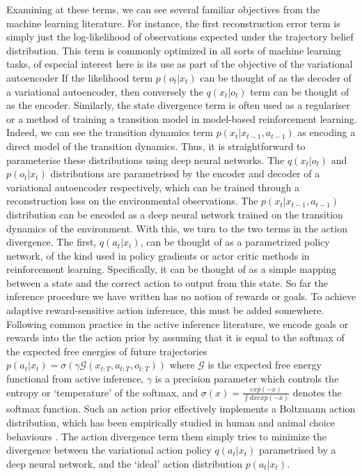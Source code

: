 Examining at these terms, we can see several familiar objectives from the machine learning literature. For instance, the first reconstruction error term is simply just the log-likelihood of observations expected under the trajectory belief distribution. This term is commonly optimized in all sorts of machine learning tasks, of especial interest here is its use as part of the objective of the variational autoencoder \citep{kingma_auto-encoding_2013} If the likelihood term $p(o_t | x_t)$ can be thought of as the decoder of a variational autoencoder, then conversely the $q(x_t | o_t)$ term can be thought of as the encoder. Similarly, the state divergence term is often used as a regulariser or a method of training a transition model in model-based reinforcement learning. Indeed, we can see the transition dynamics term $p(x_t | x_{t-1}, a_{t-1})$ as encoding a direct model of the transition dynamics. Thus, it is straightforward to parameterise these distributions using deep neural networks. The $q(x_t | o_t)$ and $p(o_t | x_t)$ distributions are parametrised by the encoder and decoder of a variational autoencoder respectively, which can be trained through a reconstruction loss on the environmental observations. The $p(x_t | x_{t-1}, a_{t-1})$ distribution can be encoded as a deep neural network trained on the transition dynamics of the environment. With this, we turn to the two terms in the action divergence. The first, $q(a_t | x_t)$, can be thought of as a parametrized policy network, of the kind used in policy gradients or actor critic methods in reinforcement learning. Specifically, it can be thought of as a simple mapping between a state and the correct action to output from this state. So far the inference procedure we have written has no notion of rewards or goals. To achieve adaptive reward-sensitive action inference, this must be added somewhere. Following common practice in the active inference literature, we encode goals or rewards into the
the action prior by assuming that it is equal to the softmax of the expected free energies of future trajectories $p(a_t | x_t) = \sigma(\gamma \mathcal{G}(x_{t:T}, a_{t:T}, o_{t:T}))$ where $\mathcal{G}$ is the expected free energy functional from active inference, $\gamma$ is a precision parameter which controls the entropy or `temperature' of the softmax, and $\sigma(x) = \frac{exp(-x)}{\int dx exp(-x)}$ denotes the softmax function. Such an action prior effectively implements a Boltzmann action distribution, which has been empirically studied in human and animal choice behaviours \citep{daw2006cortical}. The action divergence term them simply tries to minimize the divergence between the variational action policy $q(a_t | x_t)$ parametrised by a deep neural network, and the `ideal' action distribution $p(a_t | x_t)$.

